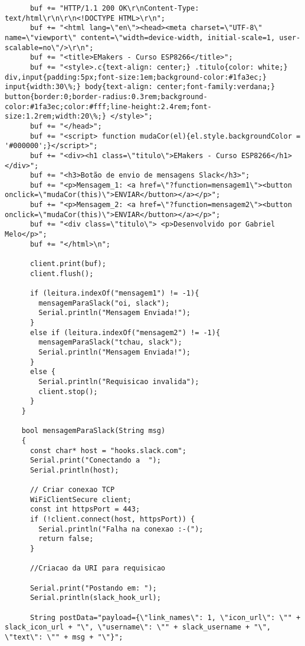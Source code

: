 \documentclass[
	11pt,				%
	openright,			%
	twoside,			%
	a5paper,			%
	english,			%
	french,				%
	spanish,			%
	brazil,				%
	sumario=tradicional
]{abntex2}
\begin{document}
\begin{lstlisting}
      buf += "HTTP/1.1 200 OK\r\nContent-Type: text/html\r\n\r\n<!DOCTYPE HTML>\r\n";
      buf += "<html lang=\"en\"><head><meta charset=\"UTF-8\" name=\"viewport\" content=\"width=device-width, initial-scale=1, user-scalable=no\"/>\r\n";
      buf += "<title>EMakers - Curso ESP8266</title>";
      buf += "<style>.c{text-align: center;} .titulo{color: white;} div,input{padding:5px;font-size:1em;background-color:#1fa3ec;} input{width:30\%;} body{text-align: center;font-family:verdana;} button{border:0;border-radius:0.3rem;background-color:#1fa3ec;color:#fff;line-height:2.4rem;font-size:1.2rem;width:20\%;} </style>";
      buf += "</head>";
      buf += "<script> function mudaCor(el){el.style.backgroundColor = '#000000';}</script>";
      buf += "<div><h1 class=\"titulo\">EMakers - Curso ESP8266</h1></div>";
      buf += "<h3>Botão de envio de mensagens Slack</h3>";
      buf += "<p>Mensagem_1: <a href=\"?function=mensagem1\"><button onclick=\"mudaCor(this)\">ENVIAR</button></a></p>";
      buf += "<p>Mensagem_2: <a href=\"?function=mensagem2\"><button onclick=\"mudaCor(this)\">ENVIAR</button></a></p>";
      buf += "<div class=\"titulo\"> <p>Desenvolvido por Gabriel Melo</p>";
      buf += "</html>\n";
    
      client.print(buf);
      client.flush();
    
      if (leitura.indexOf("mensagem1") != -1){
        mensagemParaSlack("oi, slack");
        Serial.println("Mensagem Enviada!");
      }
      else if (leitura.indexOf("mensagem2") != -1){
        mensagemParaSlack("tchau, slack");
        Serial.println("Mensagem Enviada!");
      }
      else {
        Serial.println("Requisicao invalida");
        client.stop();
      }
    }
    
    bool mensagemParaSlack(String msg)
    {
      const char* host = "hooks.slack.com";
      Serial.print("Conectando a  ");
      Serial.println(host);
    
      // Criar conexao TCP
      WiFiClientSecure client;
      const int httpsPort = 443;
      if (!client.connect(host, httpsPort)) {
        Serial.println("Falha na conexao :-(");
        return false;
      }
    
      //Criacao da URI para requisicao
    
      Serial.print("Postando em: ");
      Serial.println(slack_hook_url);
    
      String postData="payload={\"link_names\": 1, \"icon_url\": \"" + slack_icon_url + "\", \"username\": \"" + slack_username + "\", \"text\": \"" + msg + "\"}";
    

\end{lstlisting}
\end{document}
